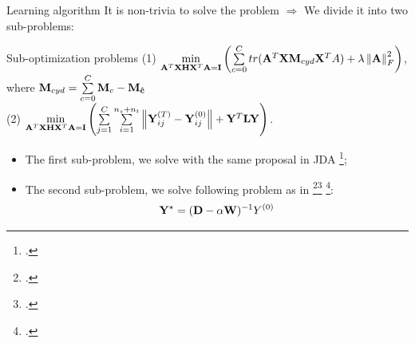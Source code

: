 \documentclass{beamer}
\begin{document}
\begin{frame}{Learning algorithm}
It is non-trivia to solve the problem $\Rightarrow$ We divide it into two sub-problems:
\begin{block}{Sub-optimization problems}
(1) $ \mathop {\min }\limits_{{{\bf{A}}^T}{\bf{XH}}{{\bf{X}}^T}{\bf{A}} = {\bf{I}}} \left( {\sum\limits_{c = 0}^C {tr({{\bf{A}}^T}{\bf{X}}{{\bf{M}}_{cyd}}{{\bf{X}}^T}A)}  + \lambda \left\| {\bf{A}} \right\|_F^2} \right) $, where ${{\bf{M}}_{cyd}} = \sum\limits_{c = 0}^C {{{\bf{M}}_c} - {{\bf{M}}_{{\bf{\hat c}}}}} $ \\ 
 (2)  $\mathop {\min }\limits_{{{\bf{A}}^T}{\bf{XH}}{{\bf{X}}^T}{\bf{A}} = {\bf{I}}} \left( {\sum\limits_{j = 1}^C {\sum\limits_{i = 1}^{{n_s} + {n_t}} {\left\| {{\bf{Y}}_{ij}^{(T)} - {\bf{Y}}_{ij}^{(0)}} \right\|} }  + {{\bf{Y}}^T}{\bf{L}}{\bf{Y}}} \right)$. 
\end{block}
\begin{itemize}
\item The first sub-problem, we solve with the same proposal in   JDA \footcite{long2013transfer};
\item The second sub-problem, we solve following problem as in \footcite{Zhou04learningwith}\footcite{6341755} \footcite{6619251}:  
\begin{equation}\label{eq:Y_optimal}
	{{\bf{Y}}^ \star } = {({\bf{D}} - \alpha {\bf{W}})^{ - 1}}{Y^{(0)}}
\end{equation}
\end{itemize}
\end{frame}
\end{document}
